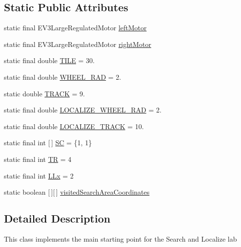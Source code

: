 \subsection*{Static Public Attributes}
\begin{DoxyCompactItemize}
\item 
static final E\+V3\+Large\+Regulated\+Motor \hyperlink{classca_1_1mcgill_1_1ecse211_1_1lab5_1_1_lab5_a613e69d8f1e90a1161b78020571110fc}{left\+Motor}
\item 
static final E\+V3\+Large\+Regulated\+Motor \hyperlink{classca_1_1mcgill_1_1ecse211_1_1lab5_1_1_lab5_a70575e1c6e84cd9d22cadd141ad6ceae}{right\+Motor}
\item 
static final double \hyperlink{classca_1_1mcgill_1_1ecse211_1_1lab5_1_1_lab5_a099ba21be1cd8d54a57c40cd0d35701d}{T\+I\+LE} = 30.
\item 
static final double \hyperlink{classca_1_1mcgill_1_1ecse211_1_1lab5_1_1_lab5_ab9b6fc96d3fb1ac6c7d69d1727b3bbdd}{W\+H\+E\+E\+L\+\_\+\+R\+AD} = 2.
\item 
static double \hyperlink{classca_1_1mcgill_1_1ecse211_1_1lab5_1_1_lab5_a401ed72b19795f01e72c8d2a69d9faba}{T\+R\+A\+CK} = 9.
\item 
static final double \hyperlink{classca_1_1mcgill_1_1ecse211_1_1lab5_1_1_lab5_a6bc8fbcc688c767a11226cb7b5da3411}{L\+O\+C\+A\+L\+I\+Z\+E\+\_\+\+W\+H\+E\+E\+L\+\_\+\+R\+AD} = 2.
\item 
static final double \hyperlink{classca_1_1mcgill_1_1ecse211_1_1lab5_1_1_lab5_a971cb3d8a46c2b41bcadf08f21498d6d}{L\+O\+C\+A\+L\+I\+Z\+E\+\_\+\+T\+R\+A\+CK} = 10.
\item 
static final int \mbox{[}$\,$\mbox{]} \hyperlink{classca_1_1mcgill_1_1ecse211_1_1lab5_1_1_lab5_a39cbd32759fdb575b92b694f2713085d}{SC} = \{1, 1\}
\item 
static final int \hyperlink{classca_1_1mcgill_1_1ecse211_1_1lab5_1_1_lab5_a0dd5ea6f697d2221ed8c8bb4df1cac7f}{TR} = 4
\item 
static final int \hyperlink{classca_1_1mcgill_1_1ecse211_1_1lab5_1_1_lab5_a957a526ed669e9d8b7fc485e21385ee9}{L\+Lx} = 2
\item 
static boolean \mbox{[}$\,$\mbox{]}\mbox{[}$\,$\mbox{]} \hyperlink{classca_1_1mcgill_1_1ecse211_1_1lab5_1_1_lab5_a27ae00bb6fbeed54573af9cc5c3dc32e}{visited\+Search\+Area\+Coordinates}
\end{DoxyCompactItemize}


\subsection{Detailed Description}
This class implements the main starting point for the Search and Localize lab

